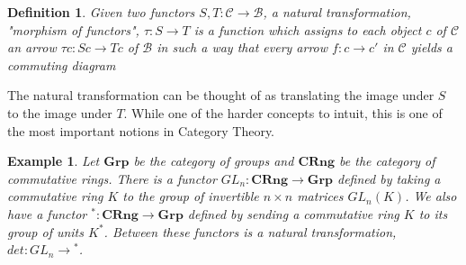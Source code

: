 \documentclass[12pt,a4paper]{article}
\newtheorem{example}[theorem]{Example}
\newtheorem{definition}[theorem]{Definition}
\newcommand\BB{\mathcal{B}}
\newcommand\CC{\mathcal{C}}
\begin{document}
\begin{definition}
    Given two functors $S,T:\CC\to\BB$, a \textit{natural transformation}, "morphism of functors", $\tau:S\to T$ is a function which assigns to each object $c$ of $\CC$ an arrow $\tau c:Sc\to Tc$ of $\BB$ in such a way that every arrow $f:c\to c'$ in $\CC$ yields a commuting diagram\\
    \begin{center}
    \end{center}
\end{definition}

 The natural transformation can be thought of as translating the image under $S$ to the image under $T$.
 While one of the harder concepts to intuit, this is one of the most important notions in Category Theory.

 \begin{example}
     Let $\textbf{Grp}$ be the category of groups and $\textbf{CRng}$ be the category of commutative rings.
     There is a functor $GL_n:\textbf{CRng}\to\textbf{Grp}$ defined by taking a commutative ring $K$ to the group of invertible $n\times n$ matrices $GL_n(K)$.
     We also have a functor ${}^*:\textbf{CRng}\to\textbf{Grp}$ defined by sending a commutative ring $K$ to its group of units $K^*$.
     Between these functors is a natural transformation, $det:GL_n\to{}^*$.
     \begin{center}
     \end{center}   
 \end{example}
\end{document}

